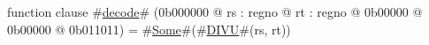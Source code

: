 function clause #\hyperref[zdecode]{decode}# (0b000000 @ rs : regno @ rt : regno @ 0b00000 @ 0b00000 @ 0b011011) =
  #\hyperref[zSome]{Some}#(#\hyperref[zDIVU]{DIVU}#(rs, rt))
